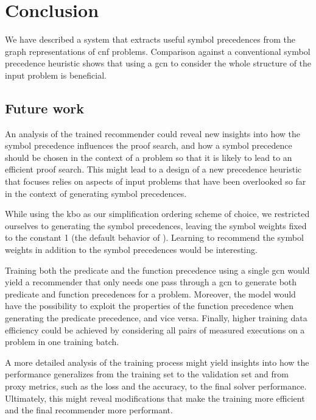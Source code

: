 \documentclass[runningheads]{llncs}
\begin{document}

\section{Conclusion}
\label{sec:conclusion}

We have described a system that extracts useful symbol precedences from the graph representations of \gls{cnf} problems.
Comparison against a conventional symbol precedence heuristic shows that using a \gls{gcn}
to consider the whole structure of the input problem is beneficial.

\subsection{Future work}

An analysis of the trained recommender could reveal new insights into how the symbol precedence influences the proof search,
and how a symbol precedence should be chosen in the context of a problem so that it is likely to lead to an efficient proof search.
This might lead to a design of a new precedence heuristic
that focuses relies on aspects of input problems
that have been overlooked so far in the context of generating symbol precedences.

While using the \gls{kbo} as our simplification ordering scheme of choice,
we restricted ourselves to generating the symbol precedences,
leaving the symbol weights fixed to the constant 1 (the default behavior of \Vampire{}).
Learning to recommend the symbol weights in addition to the symbol precedences would be interesting.

Training both the predicate and the function precedence using a single \gls{gcn} would yield a recommender
that only needs one pass through a \gls{gcn} to generate both predicate and function precedences for a problem.
Moreover, the model would have the possibility to exploit the properties of the function precedence
when generating the predicate precedence, and vice versa.
Finally, higher training data efficiency could be achieved by considering all pairs of measured executions on a problem
in one training batch.

A more detailed analysis of the training process might yield insights into how the performance generalizes
from the training set to the validation set
and from proxy metrics, such as the loss and the accuracy, to the final solver performance.
Ultimately, this might reveal modifications that make the training more efficient and the final recommender more performant.
\end{document}
